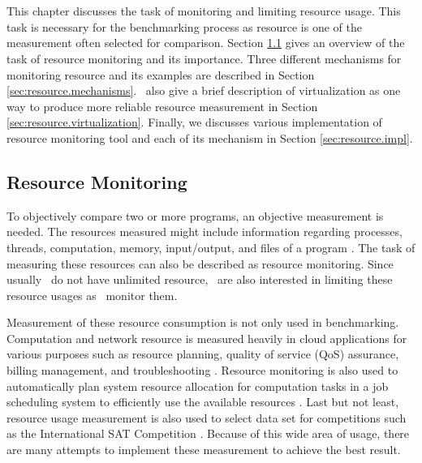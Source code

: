 \chapter{\chResource}
\label{ch:resource}

This chapter discusses the task of monitoring and limiting resource usage.
This task is necessary for the benchmarking process as resource is one of the measurement often selected for comparison.
Section \ref{sec:resource.overview} gives an overview of the task of resource monitoring and its importance.
Three different mechanisms for monitoring resource and its examples are described in Section \ref{sec:resource.mechanisms}.
\First~also give a brief description of virtualization as one way to produce more reliable resource measurement in Section \ref{sec:resource.virtualization}.
Finally, we discusses various implementation of resource monitoring tool and each of its mechanism in Section \ref{sec:resource.impl}.

\section{Resource Monitoring}
\label{sec:resource.overview}

To objectively compare two or more programs, an objective measurement is needed.
The resources measured might include information regarding processes, threads, computation, memory, input/output, and files of a program \citep{juvePracticalResourceMonitoring2015}.
The task of measuring these resources can also be described as resource monitoring.
Since usually \first~do not have unlimited resource, \first~are also interested in limiting these resource usages as \first~monitor them.

Measurement of these resource consumption is not only used in benchmarking.
Computation and network resource is measured heavily in cloud applications for various purposes such as resource planning, quality of service (QoS) assurance, billing management, and troubleshooting \citep{aceto2013cloud}.
Resource monitoring is also used to automatically plan system resource allocation for computation tasks in a job scheduling system to efficiently use the available resources \citep{tovarJobSizingStrategy2018}.
Last but not least, resource usage measurement is also used to select data set for competitions such as the International SAT Competition \citep{heule2018proceedings}.
Because of this wide area of usage, there are many attempts to implement these measurement to achieve the best result.

